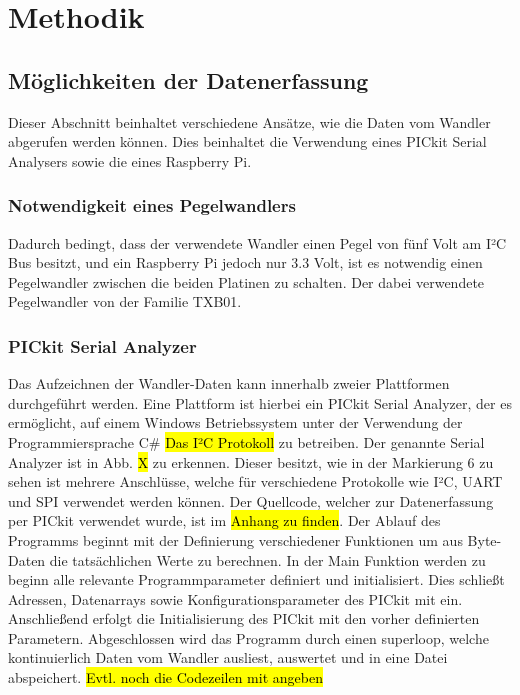 \section{Methodik}

\subsection{Möglichkeiten der Datenerfassung}
Dieser Abschnitt beinhaltet verschiedene Ansätze, wie die Daten vom Wandler abgerufen werden können. Dies beinhaltet die Verwendung eines PICkit Serial Analysers sowie die eines Raspberry Pi.


\subsubsection{Notwendigkeit eines Pegelwandlers}
Dadurch bedingt, dass der verwendete Wandler einen Pegel von fünf Volt am I²C Bus besitzt, und ein Raspberry Pi jedoch nur 3.3 Volt, ist es notwendig einen Pegelwandler zwischen die beiden Platinen zu schalten. Der dabei verwendete Pegelwandler von der Familie TXB01.

\subsubsection{PICkit Serial Analyzer}
Das Aufzeichnen der Wandler-Daten kann innerhalb zweier Plattformen durchgeführt werden. Eine Plattform ist hierbei ein PICkit Serial Analyzer, der es ermöglicht, auf einem Windows Betriebssystem unter der Verwendung der Programmiersprache C# \hl{Das I²C Protokoll} zu betreiben. Der genannte Serial Analyzer ist in Abb. \hl{X} zu erkennen. Dieser besitzt, wie in der Markierung 6 zu sehen ist mehrere Anschlüsse, welche für verschiedene Protokolle wie I²C, UART und SPI verwendet werden können. Der Quellcode, welcher zur Datenerfassung per PICkit verwendet wurde, ist im \hl{Anhang zu finden}. Der Ablauf des Programms beginnt mit der Definierung verschiedener Funktionen um aus Byte-Daten die tatsächlichen Werte zu berechnen. In der Main Funktion werden zu beginn alle relevante Programmparameter definiert und initialisiert. Dies schließt Adressen, Datenarrays sowie Konfigurationsparameter des PICkit mit ein.  Anschließend erfolgt die Initialisierung des PICkit mit den vorher definierten Parametern. Abgeschlossen wird das Programm durch einen superloop, welche kontinuierlich Daten vom Wandler ausliest, auswertet und in eine Datei abspeichert. \hl{Evtl. noch die Codezeilen mit angeben}

